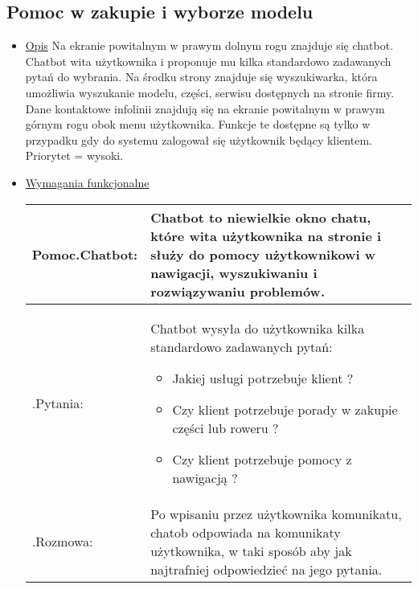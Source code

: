 \documentclass[a4paper,20pt]{article}
\begin{document}
\begin{itemize}
{}

\end{itemize}



\subsection{Pomoc w zakupie i wyborze modelu}

\begin{itemize}
\item \underline{Opis} 
\newline
\newline
Na ekranie powitalnym w prawym dolnym rogu znajduje się chatbot. Chatbot wita użytkownika i proponuje mu kilka standardowo zadawanych pytań do wybrania. Na środku strony znajduje się wyszukiwarka, która umożliwia wyszukanie modelu, części, serwisu dostępnych na stronie firmy. Dane kontaktowe infolinii znajdują się na ekranie powitalnym w prawym górnym rogu obok menu użytkownika. Funkcje te dostępne są tylko w przypadku gdy do systemu zalogował się użytkownik będący klientem. Priorytet = wysoki. 
\newline

\item \underline{Wymagania funkcjonalne}

\begin{center}
\begin{tabularx}{\textwidth}[t]{XX}

\arrayrulecolor{black}\hline
\textbf{Pomoc.Chatbot:} & \textbf{Chatbot to niewielkie okno chatu, które wita użytkownika na stronie i służy do pomocy użytkownikowi w nawigacji, wyszukiwaniu i rozwiązywaniu problemów.} \\

\hline

\quad .Pytania: & 
\begin{minipage}[t]{\linewidth}%
Chatbot wysyła do użytkownika kilka standardowo zadawanych pytań:
\begin{itemize}
\item Jakiej usługi potrzebuje klient ?
\item Czy klient potrzebuje porady w zakupie części lub roweru ?
\item Czy klient potrzebuje pomocy z nawigacją ?
\end{itemize} 
\end{minipage}\\


\quad .Rozmowa: & 
\begin{minipage}[t]{\linewidth}%
Po wpisaniu przez użytkownika komunikatu, chatob odpowiada na komunikaty użytkownika, w taki sposób aby jak najtrafniej odpowiedzieć na jego pytania. 
\end{minipage}\\




\end{tabularx}
\end{center}
\end{itemize}
\end{document}
